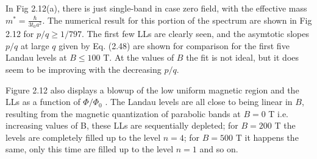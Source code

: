 \documentclass{report}
\begin{document}
In Fig 2.12(a), there is just single-band in case zero field, with the effective mass $m^{*} = \frac{\hbar}{3 t_{0} a^{2}}$. The numerical result for this portion of the spectrum are shown in Fig 2.12 for $p/q \geq 1/797$. The first few LLs are clearly seen, and the asymtotic slopes $p/q$ at large $q$ given by Eq. (2.48) are shown for comparison for the first five Landau levels at $B \leq 100$ T. At the values of $B$ the fit is not ideal, but it does seem to be improving with the decreasing $p/q$.

Figure 2.12 also displays a blowup of the low uniform magnetic region and the \ac{LLs} as a function of $\Phi / \Phi_{0}$ \cite{Li_2011}. The Landau levels are all close to being linear in $B$, resulting from the magnetic quantization of parabolic bands at $B = 0$ T i.e. increasing values of B, these \ac{LLs} are sequentially depleted; for $B=200$ T the levels are completely filled up to the level $n=4$; for $B = 500$ T it happens the same, only this time are filled up to the level $n=1$ and so on.

%
%
\end{document}
